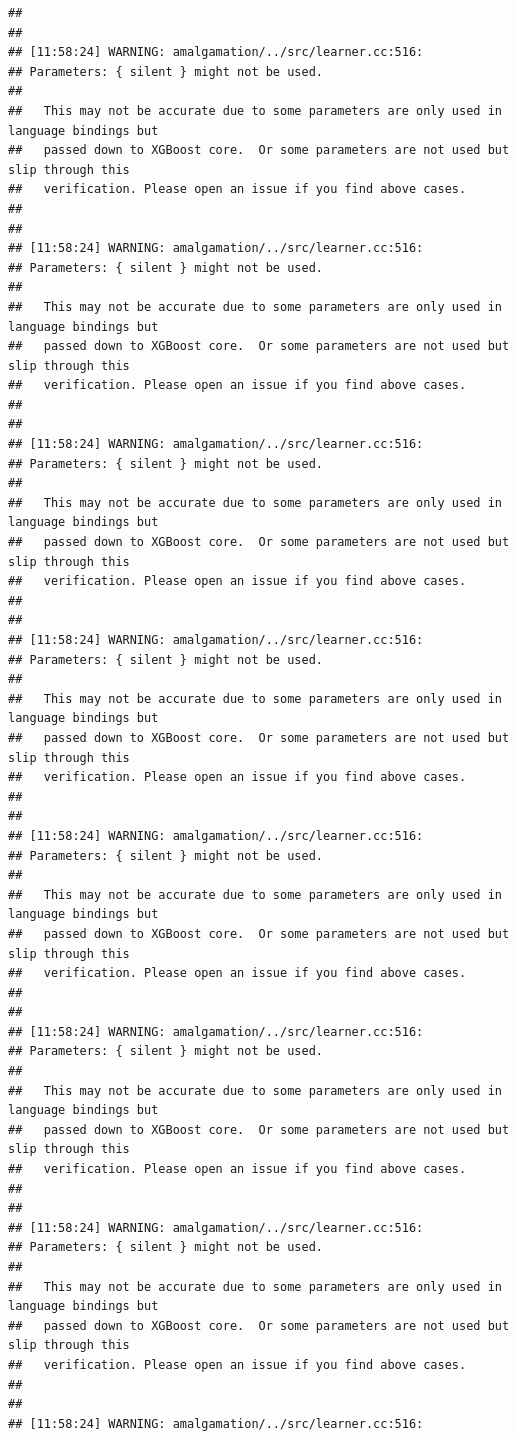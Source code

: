 \documentclass[AMS,STIX2COL]{WileyNJD-v2}\usepackage[]{graphicx}\usepackage[]{color}
\makeatletter
\newenvironment{kframe}{%
 \def\at@end@of@kframe{}%
 \ifinner\ifhmode%
  \def\at@end@of@kframe{\end{minipage}}%
  \begin{minipage}{\columnwidth}%
 \fi\fi%
 \def\FrameCommand##1{\hskip\@totalleftmargin \hskip-\fboxsep
 \colorbox{shadecolor}{##1}\hskip-\fboxsep
     \hskip-\linewidth \hskip-\@totalleftmargin \hskip\columnwidth}%
 \MakeFramed {\advance\hsize-\width
   \@totalleftmargin\z@ \linewidth\hsize
   \@setminipage}}%
 {\par\unskip\endMakeFramed%
 \at@end@of@kframe}
\newenvironment{knitrout}{}{} %
\makeatother
\begin{document}
\begin{knitrout}
\begin{kframe}
\begin{verbatim}
## 
## 
## [11:58:24] WARNING: amalgamation/../src/learner.cc:516: 
## Parameters: { silent } might not be used.
## 
##   This may not be accurate due to some parameters are only used in language bindings but
##   passed down to XGBoost core.  Or some parameters are not used but slip through this
##   verification. Please open an issue if you find above cases.
## 
## 
## [11:58:24] WARNING: amalgamation/../src/learner.cc:516: 
## Parameters: { silent } might not be used.
## 
##   This may not be accurate due to some parameters are only used in language bindings but
##   passed down to XGBoost core.  Or some parameters are not used but slip through this
##   verification. Please open an issue if you find above cases.
## 
## 
## [11:58:24] WARNING: amalgamation/../src/learner.cc:516: 
## Parameters: { silent } might not be used.
## 
##   This may not be accurate due to some parameters are only used in language bindings but
##   passed down to XGBoost core.  Or some parameters are not used but slip through this
##   verification. Please open an issue if you find above cases.
## 
## 
## [11:58:24] WARNING: amalgamation/../src/learner.cc:516: 
## Parameters: { silent } might not be used.
## 
##   This may not be accurate due to some parameters are only used in language bindings but
##   passed down to XGBoost core.  Or some parameters are not used but slip through this
##   verification. Please open an issue if you find above cases.
## 
## 
## [11:58:24] WARNING: amalgamation/../src/learner.cc:516: 
## Parameters: { silent } might not be used.
## 
##   This may not be accurate due to some parameters are only used in language bindings but
##   passed down to XGBoost core.  Or some parameters are not used but slip through this
##   verification. Please open an issue if you find above cases.
## 
## 
## [11:58:24] WARNING: amalgamation/../src/learner.cc:516: 
## Parameters: { silent } might not be used.
## 
##   This may not be accurate due to some parameters are only used in language bindings but
##   passed down to XGBoost core.  Or some parameters are not used but slip through this
##   verification. Please open an issue if you find above cases.
## 
## 
## [11:58:24] WARNING: amalgamation/../src/learner.cc:516: 
## Parameters: { silent } might not be used.
## 
##   This may not be accurate due to some parameters are only used in language bindings but
##   passed down to XGBoost core.  Or some parameters are not used but slip through this
##   verification. Please open an issue if you find above cases.
## 
## 
## [11:58:24] WARNING: amalgamation/../src/learner.cc:516: 

\end{verbatim}
\end{kframe}
\end{knitrout}
\end{document}

